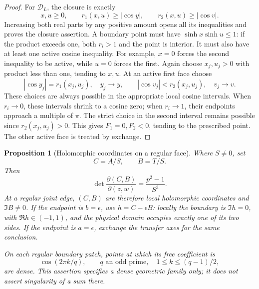 \documentclass[11pt]{article}
\numberwithin{equation}{section}
\newtheorem{proposition}[theorem]{Proposition}
\theoremstyle{definition}
\newcommand{\DL}{\mathcal D_L}
\begin{document}
\begin{proof}
For \(\DL\), the closure is exactly
\begin{equation}\label{geo:LT-closure}
 x,u\geq0,\qquad r_1(x,u)\geq|\cos y|,\qquad
 r_2(x,u)\geq|\cos v|.
\end{equation}
Increasing both real parts by any positive amount opens
all its inequalities and proves the closure assertion.
A boundary point must have
\(\sinh x\sinh u\leq1\): if the product exceeds one,
both \(r_i>1\) and the point is interior.
It must also have at least one active cosine inequality.
For example, \(x=0\) forces the second inequality to be
active, while \(u=0\) forces the first.
Again choose \(x_j,u_j>0\) with product less than one,
tending to \(x,u\).  At an active first face choose
\[
 |\cos y_j|=r_1(x_j,u_j),\quad y_j\to y,
 \qquad
 |\cos v_j|<r_2(x_j,u_j),\quad v_j\to v .
 \]
These choices are always possible in the appropriate
local cosine intervals.  When \(r_i\to0\), these intervals
shrink to a cosine zero; when \(r_i\to1\), their endpoints
approach a multiple of \(\pi\).  The strict choice in the
second interval remains possible since \(r_2(x_j,u_j)>0\).
This gives \(F_1=0,F_2<0\), tending to the prescribed point.
The other active face is treated by exchange.
\end{proof}

\begin{proposition}[Holomorphic coordinates on a regular face]
\label{geo:local-coordinates}
Where \(S\ne0\), set
\[
                         C=A/S,\qquad B=T/S.
\]
Then
\begin{equation}\label{geo:Jacobian}
             \det\frac{\partial(C,B)}{\partial(z,w)}
                    =\frac{p^2-1}{S^3}.
\end{equation}
At a regular joint edge, \((C,B)\) are therefore local
holomorphic coordinates and \(\Im B\ne0\).
If the endpoint is \(b=\epsilon\), use
\(h=C-\epsilon B\): locally the boundary is
\(\Im h=0\), with \(\Re h\in(-1,1)\), and the physical
domain occupies exactly one of its two sides.
If the endpoint is \(a=\epsilon\), exchange the transfer
axes for the same conclusion.

On each regular boundary patch, points at which its free
coefficient is
\[
       \cos(2\pi k/q),\qquad q\text{ an odd prime},\quad
                         1\leq k\leq(q-1)/2,
\]
are dense.  This assertion specifies a dense geometric
family only; it does not assert singularity of a sum there.
\end{proposition}
\end{document}
